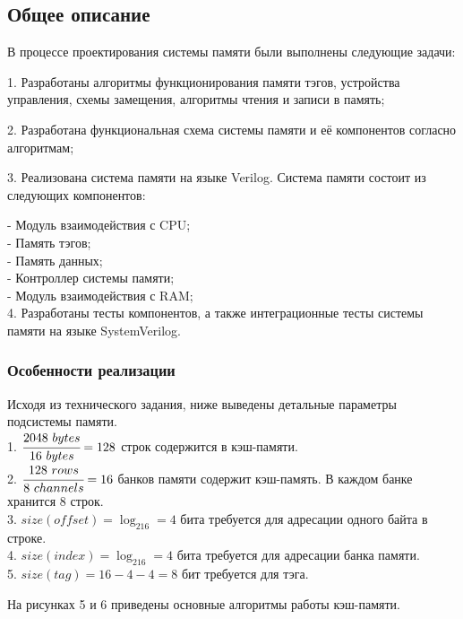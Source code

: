 \documentclass[13pt]{article}
\begin{document}
	\subsection{Общее описание}
	
	В процессе проектирования системы памяти были выполнены следующие задачи:
	
	1. Разработаны алгоритмы функционирования памяти тэгов, устройства управления, схемы замещения, алгоритмы чтения и записи в память;
	
	2. Разработана функциональная схема системы памяти и её компонентов согласно алгоритмам;
	
	3. Реализована система памяти на языке Verilog. Система памяти состоит из следующих компонентов:
	
	- Модуль взаимодействия с CPU;\\
	- Память тэгов;\\
	- Память данных;\\
	- Контроллер системы памяти;\\
	- Модуль взаимодействия с RAM;\\
	
	4. Разработаны тесты компонентов, а также интеграционные тесты системы памяти на языке SystemVerilog.\\
	\subsubsection{Особенности реализации}
	Исходя из технического задания, ниже выведены детальные параметры подсистемы памяти.\\
	1. $\cfrac{2048\ bytes}{16\ bytes} = 128$ строк содержится в кэш-памяти.\\
	2. $\cfrac{128\ rows}{8\ channels} = 16$ банков памяти содержит кэш-память. В каждом банке хранится 8 строк.\\
	3. $size(offset) = \log_216 = 4$ бита требуется для адресации одного байта в строке.\\
	4. $size(index) = \log_216 = 4$ бита требуется для адресации банка памяти.\\
	5. $size(tag) = 16-4-4 = 8$ бит требуется для тэга.
	
	На рисунках 5 и 6 приведены основные алгоритмы работы кэш-памяти.
	\newpage
\end{document}
